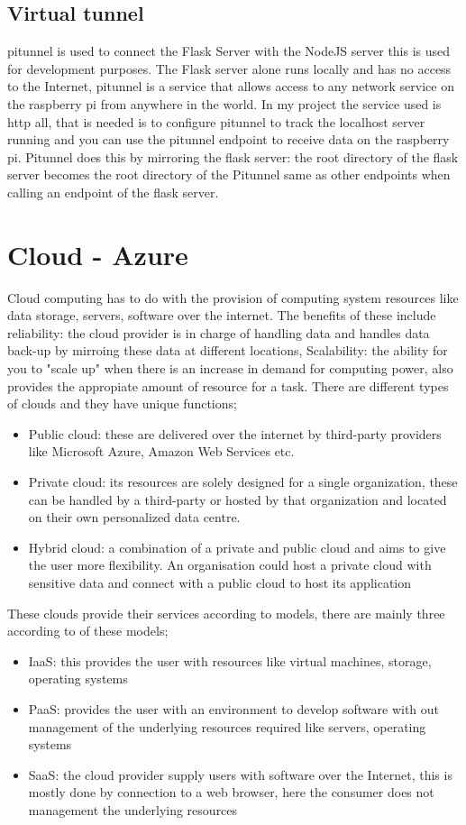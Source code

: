 \subsection{Virtual tunnel}
pitunnel is used to connect the Flask Server with the NodeJS server this is used for development purposes. The Flask server alone runs locally and has no access to the Internet, pitunnel is a service that allows access to any network service on the raspberry pi from anywhere in the world. In my project the service used is http all, that is needed is to configure pitunnel to track the localhost server running and you can use the pitunnel endpoint to receive data on the raspberry pi. Pitunnel does this by mirroring the flask server: the root directory of the flask server becomes the root directory of the Pitunnel same as other endpoints when calling an endpoint of the flask server.  

\section{Cloud - Azure}
Cloud computing has to do with the provision of computing system resources like data storage, servers, software over the internet\cite{Cloudcom53:online}. The benefits of these include reliability: the cloud provider is in charge of handling data and handles data back-up by mirroing these data at different locations, Scalability: the ability for you to "scale up" when there is an increase in demand for computing power, also provides the appropiate amount of resource for a task.
There are different types of clouds and they have unique functions;
\begin{itemize}
  \item Public cloud: these are delivered over the internet by third-party providers like Microsoft Azure, Amazon Web Services etc.
  \item Private cloud: its resources are solely designed for a single organization, these can be handled by a third-party or hosted by that organization and located on their own personalized data centre.
  \item Hybrid cloud: a combination of a private and public cloud and aims to give the user more flexibility. An organisation could host a private cloud with sensitive data and connect with a public cloud to host its application
\end{itemize}

These clouds provide their services according to models, there are mainly three according to of these models\cite{National40:online};
\begin{itemize}
  \item \gls{IaaS}: this provides the user with resources like virtual machines, storage, operating systems
  \item \gls{PaaS}: provides the user with an environment to develop software with out management of the underlying resources required like servers, operating systems
  \item \gls{SaaS}: the cloud provider supply users with software over the Internet, this is mostly done by connection to a web browser, here the consumer does not management the underlying resources 
\end{itemize}

